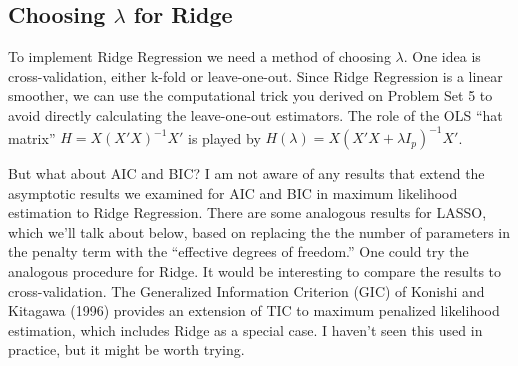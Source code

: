 \subsection{Choosing $\lambda$ for Ridge}
To implement Ridge Regression we need a method of choosing $\lambda$. One idea is cross-validation, either k-fold or leave-one-out. Since Ridge Regression is a linear smoother, we can use the computational trick you derived on Problem Set 5 to avoid directly calculating the leave-one-out estimators. The role of the OLS ``hat matrix'' $H = X(X'X)^{-1}X'$ is played by $H(\lambda) = X(X'X + \lambda I_p)^{-1} X'$.

But what about AIC and BIC? I am not aware of any results that extend the asymptotic results we examined for AIC and BIC in maximum likelihood estimation to Ridge Regression. There are some analogous results for LASSO, which we'll talk about below, based on replacing the the number of parameters in the penalty term with the ``effective degrees of freedom.'' One could try the analogous procedure for Ridge. It would be interesting to compare the results to cross-validation. The Generalized Information Criterion (GIC) of Konishi and Kitagawa (1996) provides an extension of TIC to maximum penalized likelihood estimation, which includes Ridge as a special case. I haven't seen this used in practice, but it might be worth trying.




